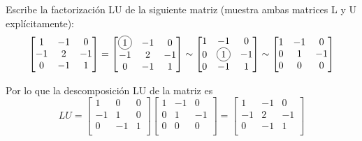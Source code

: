 \documentclass[paper=letter, fontsize=11pt]{scrartcl}
\numberwithin{equation}{section} %
\numberwithin{figure}{section} %
\numberwithin{table}{section} %
\newcommand\Circle[1]{%
  \tikz[baseline=(char.base)]\node[circle,draw,inner sep=2pt] (char) {#1};}
\newenvironment{cframed}[1][blue]
  {\begin{tcolorbox}[colframe=#1,colback=white]}
  {\end{tcolorbox}}
\begin{document}
\begin{enumerate}
\begin{cframed}[green]
\item Escribe la factorización LU de la siguiente matriz (muestra ambas matrices L y U explícitamente):
\[
\begin{bmatrix}
1 & -1 & 0   \\
-1 & 2  & -1\\
0 & -1 & 1\\
\end{bmatrix} = 
\begin{bmatrix}
\Circle{1} & -1 & 0   \\
-1 & 2  & -1\\
0 & -1 & 1\\
\end{bmatrix}  \sim \begin{bmatrix}
1 & -1 & 0   \\
0 & \Circle{1}  & -1\\
0 & -1 & 1\\
\end{bmatrix} \sim
\begin{bmatrix}
1 & -1 & 0   \\
0 & 1  & -1\\
0 & 0 & 0\\
\end{bmatrix} 
\]
\end{cframed}
Por lo que la descomposición LU de la matriz es
\[ LU = 
\begin{bmatrix}
1 & 0 & 0   \\
-1 & 1  & 0\\
0 & -1 & 1\\
\end{bmatrix}   \begin{bmatrix}
1 & -1 & 0   \\
0 & 1  & -1\\
0 & 0 & 0\\
\end{bmatrix}  = \begin{bmatrix}
1 & -1 & 0   \\
-1 & 2  & -1\\
0 & -1 & 1\\
\end{bmatrix}
\]


\end{enumerate}
\end{document}
